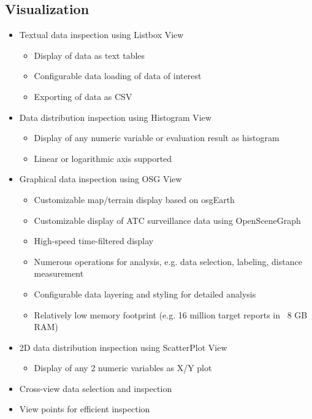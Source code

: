 \subsection{Visualization}
\begin{itemize}  
    \item Textual data inspection using Listbox View
    \begin{itemize}  
        \item Display of data as text tables
        \item Configurable data loading of data of interest
        \item Exporting of data as CSV
    \end{itemize}
    \item Data distribution inspection using Histogram View
    \begin{itemize}  
        \item Display of any numeric variable or evaluation result as histogram
        \item Linear or logarithmic axis supported
    \end{itemize}
    \item Graphical data inspection using OSG View
    \begin{itemize}  
        \item Customizable map/terrain display based on osgEarth
        \item Customizable display of ATC surveillance data using OpenSceneGraph
        \item High-speed time-filtered display
        \item Numerous operations for analysis, e.g. data selection, labeling, distance measurement
        \item Configurable data layering and styling for detailed analysis
        \item Relatively low memory footprint (e.g. 16 million target reports in ~8 GB RAM)
    \end{itemize}    
    \item 2D data distribution inspection using ScatterPlot View
    \begin{itemize}  
        \item Display of any 2 numeric variables as X/Y plot
    \end{itemize}
    \item Cross-view data selection and inspection
    \item View points for efficient inspection
\end{itemize}

